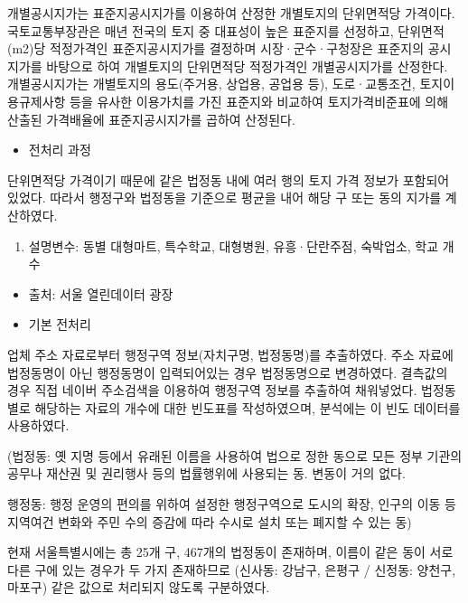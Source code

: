 \documentclass[]{article}
\providecommand{\tightlist}{%
  \setlength{\itemsep}{0pt}\setlength{\parskip}{0pt}}
\begin{document}
개별공시지가는 표준지공시지가를 이용하여 산정한 개별토지의 단위면적당
가격이다. 국토교통부장관은 매년 전국의 토지 중 대표성이 높은 표준지를
선정하고, 단위면적(m2)당 적정가격인 표준지공시지가를 결정하며
시장·군수·구청장은 표준지의 공시지가를 바탕으로 하여 개별토지의
단위면적당 적정가격인 개별공시지가를 산정한다. 개별공시지가는 개별토지의
용도(주거용, 상업용, 공업용 등), 도로·교통조건, 토지이용규제사항 등을
유사한 이용가치를 가진 표준지와 비교하여 토지가격비준표에 의해 산출된
가격배율에 표준지공시지가를 곱하여 산정된다.

\begin{itemize}
\tightlist
\item
  전처리 과정
\end{itemize}

단위면적당 가격이기 때문에 같은 법정동 내에 여러 행의 토지 가격 정보가
포함되어 있었다. 따라서 행정구와 법정동을 기준으로 평균을 내어 해당 구
또는 동의 지가를 계산하였다.

\begin{enumerate}
\def\labelenumi{\arabic{enumi})}
\setcounter{enumi}{1}
\tightlist
\item
  설명변수: 동별 대형마트, 특수학교, 대형병원, 유흥·단란주점, 숙박업소,
  학교 개수
\end{enumerate}

\begin{itemize}
\item
  출처: 서울 열린데이터 광장
\item
  기본 전처리
\end{itemize}

업체 주소 자료로부터 행정구역 정보(자치구명, 법정동명)를 추출하였다.
주소 자료에 법정동명이 아닌 행정동명이 입력되어있는 경우 법정동명으로
변경하였다. 결측값의 경우 직접 네이버 주소검색을 이용하여 행정구역
정보를 추출하여 채워넣었다. 법정동별로 해당하는 자료의 개수에 대한
빈도표를 작성하였으며, 분석에는 이 빈도 데이터를 사용하였다.

(법정동: 옛 지명 등에서 유래된 이름을 사용하여 법으로 정한 동으로 모든
정부 기관의 공무나 재산권 및 권리행사 등의 법률행위에 사용되는 동.
변동이 거의 없다.

행정동: 행정 운영의 편의를 위하여 설정한 행정구역으로 도시의 확장,
인구의 이동 등 지역여건 변화와 주민 수의 증감에 따라 수시로 설치 또는
폐지할 수 있는 동)

현재 서울특별시에는 총 25개 구, 467개의 법정동이 존재하며, 이름이 같은
동이 서로 다른 구에 있는 경우가 두 가지 존재하므로 (신사동: 강남구,
은평구 / 신정동: 양천구, 마포구) 같은 값으로 처리되지 않도록 구분하였다.
\end{document}
